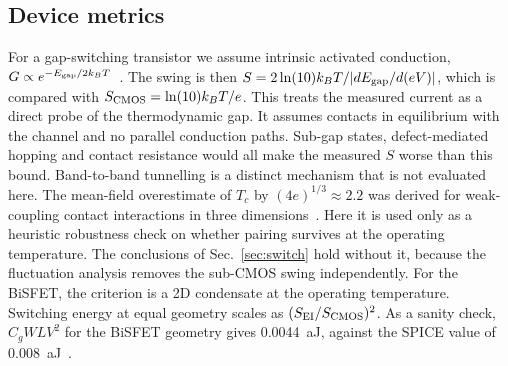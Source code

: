 \documentclass[aip,jap,reprint,amsmath,amssymb]{revtex4-2}
\begin{document}
\subsection{Device metrics}
For a gap-switching transistor we assume intrinsic activated conduction, $G\propto e^{-E_{\rm gap}/2k_BT}$~\cite{Sze2007}. The swing is then
$S=2\ln(10)k_BT/|dE_{\rm gap}/d(eV)|$, which is compared with $S_{\rm CMOS}=\ln(10)k_BT/e$. This treats the measured current as a direct probe of the thermodynamic gap. It assumes contacts in equilibrium with the channel and no
parallel conduction paths. Sub-gap states, defect-mediated hopping and contact resistance would all make the measured $S$ worse than this
bound. Band-to-band tunnelling is a distinct mechanism that is not evaluated here. The mean-field overestimate of $T_c$ by $(4e)^{1/3}\approx2.2$ was derived for weak-coupling contact interactions in
three dimensions~\cite{GorkovMB1961,Randeria2014}. Here it is used only as a heuristic robustness check on whether pairing survives at the
operating temperature. The conclusions of Sec.~\ref{sec:switch} hold without it, because the fluctuation analysis removes the sub-CMOS
swing independently.
For the BiSFET, the criterion is a 2D condensate at the operating temperature. Switching energy at equal geometry scales
as $(S_{\rm EI}/S_{\rm CMOS})^2$. As a sanity check, $C_gWLV^2$ for the BiSFET geometry gives 0.0044~aJ, against the
SPICE value of 0.008~aJ~\cite{Banerjee2009}.
\end{document}
